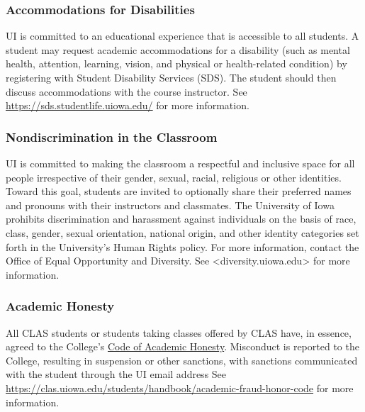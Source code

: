 \documentclass[]{article}
\begin{document}
\hypertarget{accommodations-for-disabilities}{%
\subsubsection{Accommodations for
Disabilities}\label{accommodations-for-disabilities}}

UI is committed to an educational experience that is accessible to all
students. A student may request academic accommodations for a disability
(such as mental health, attention, learning, vision, and physical or
health-related condition) by registering with Student Disability
Services (SDS). The student should then discuss accommodations with the
course instructor. See \url{https://sds.studentlife.uiowa.edu/} for more
information.

\hypertarget{nondiscrimination-in-the-classroom}{%
\subsubsection{Nondiscrimination in the
Classroom}\label{nondiscrimination-in-the-classroom}}

UI is committed to making the classroom a respectful and inclusive space
for all people irrespective of their gender, sexual, racial, religious
or other identities. Toward this goal, students are invited to
optionally share their preferred names and pronouns with their
instructors and classmates. The University of Iowa prohibits
discrimination and harassment against individuals on the basis of race,
class, gender, sexual orientation, national origin, and other identity
categories set forth in the University's Human Rights policy. For more
information, contact the Office of Equal Opportunity and Diversity. See
\textless{}diversity.uiowa.edu\textgreater{} for more information.

\hypertarget{academic-honesty}{%
\subsubsection{Academic Honesty}\label{academic-honesty}}

All CLAS students or students taking classes offered by CLAS have, in
essence, agreed to the College's
\href{https://clas.uiowa.edu/students/handbook/academic-fraud-honor-code}{Code
of Academic Honesty}. Misconduct is reported to the College, resulting
in suspension or other sanctions, with sanctions communicated with the
student through the UI email address See
\url{https://clas.uiowa.edu/students/handbook/academic-fraud-honor-code}
for more information.
\end{document}
